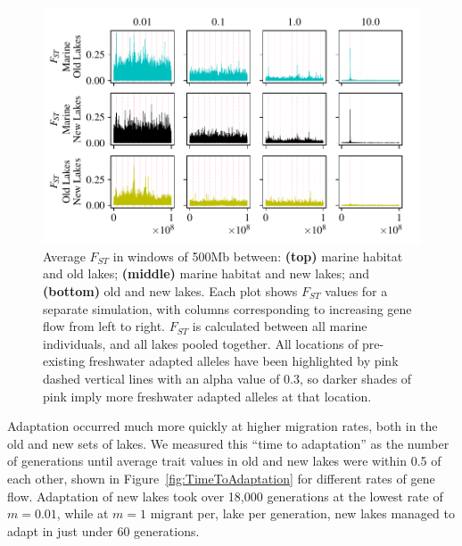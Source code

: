 \documentclass{article}
\begin{document}
\begin{figure}
    \begin{center}
        \includegraphics[width=\textwidth]{Final_Plots/Fst_Genome_faa.pdf}
          \caption{
        Average $F_{ST}$ in windows of 500Mb between:
        \textbf{(top)} marine habitat and old lakes;
        \textbf{(middle)} marine habitat and new lakes; and
        \textbf{(bottom)} old and new lakes.
        Each plot shows $F_{ST}$ values for a separate simulation,
        with columns corresponding to increasing gene flow from left to right.
        $F_{ST}$ is calculated between all marine individuals, and all lakes pooled together.
        All locations of pre-existing freshwater adapted alleles have been highlighted by 
        pink dashed vertical lines with an alpha value of 0.3, so darker shades of pink imply more 
        freshwater adapted alleles at that location.
     } \label{fig:Fst}
    \end{center}
\end{figure}

Adaptation occurred much more quickly at higher migration rates, both in the old and new sets of lakes. We measured this ``time to adaptation'' as the number of generations until average trait values in old and new lakes were within 0.5 of each other, shown in Figure~\ref{fig:TimeToAdaptation} for different rates of gene flow. Adaptation of new lakes took over 18,000 generations at the lowest rate of $m = 0.01$, while at $m = 1$ migrant per, lake per generation, new lakes managed to adapt in just under 60 generations. 
\end{document}
